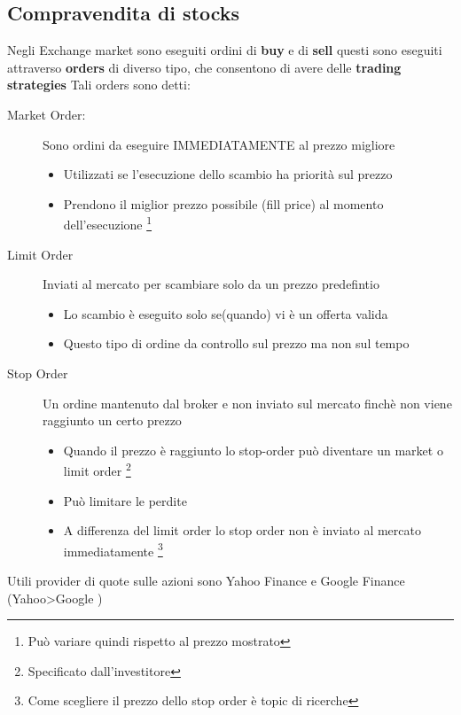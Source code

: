 \documentclass[a4paper,11pt]{report}
\begin{document}
{\subsection {Compravendita di stocks}
Negli Exchange market sono eseguiti ordini di \textbf{buy} e di \textbf{sell} \newline
questi sono eseguiti attraverso \textbf{orders} di diverso tipo, che consentono di avere delle \textbf{trading strategies}\newline
Tali orders sono detti:
\begin{description}
\item[Market Order:] Sono ordini da eseguire IMMEDIATAMENTE al prezzo migliore \newline  \begin{itemize} 
	 \item Utilizzati se l'esecuzione dello scambio ha priorità sul prezzo
 	 \item Prendono il miglior prezzo possibile (fill price) al momento dell'esecuzione {\footnote{Può variare quindi rispetto al prezzo mostrato}}
	\end{itemize}
\item[Limit Order] Inviati al mercato per scambiare solo da un prezzo predefintio \newline \begin{itemize}
	\item Lo scambio è eseguito solo se(quando) vi è un offerta valida
	\item Questo tipo di ordine da controllo sul prezzo ma non sul tempo
	\end{itemize}
\item[Stop Order] Un ordine mantenuto dal broker e non inviato sul mercato finchè non viene raggiunto un certo prezzo \newline \begin{itemize}
	\item Quando il prezzo è raggiunto lo stop-order può diventare un market o limit order \footnote{Specificato dall'investitore}
	\item Può limitare le perdite 
	\item A differenza del limit order lo stop order non è inviato al mercato immediatamente \footnote{Come scegliere il prezzo 		dello stop order è topic di ricerche}
\end{itemize}
\end{description}
Utili provider di quote sulle azioni sono Yahoo Finance e Google Finance (Yahoo>Google ) \newpage

}
\end{document}
